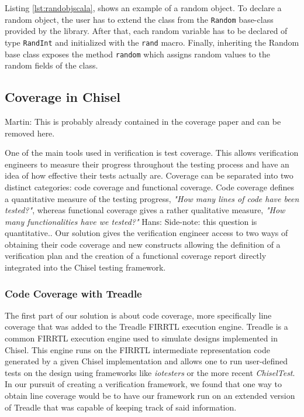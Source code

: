 \documentclass[runningheads]{llncs}
\newcommand{\code}[1]{{\small{\texttt{#1}}}}
\newcommand{\martin}[1]{{\color{blue} Martin: #1}}
\newcommand{\hjd}[1]{{\color{pink} Hans: #1}}
\begin{document}
Listing \ref{lst:randobjscala}, shows an example of a random object. To declare a random object, the user has to extend
the class from the \code{Random} base-class provided by the library. After that, each random variable has to be declared of type \code{RandInt} and initialized with the \code{rand} macro. Finally, inheriting the Random base class exposes the method \code{random} which assigns random values to the random fields of the class.

\subsection{Coverage in Chisel}

\martin{This is probably already contained in the coverage paper and can be removed here.}

One of the main tools used in verification is test coverage. This allows verification engineers to measure their progress throughout the testing process and have an idea of how effective their tests actually are. Coverage can be separated into two distinct categories: code coverage and functional coverage. Code coverage defines a quantitative measure of the testing progress, \textit{"How many lines of code have been tested?"}, whereas functional coverage gives a rather qualitative measure, \textit{"How many functionalities have we tested?"} \hjd{Side-note: this question is quantitative.}.  Our solution gives the verification engineer access to two ways of obtaining their code coverage and new constructs allowing the definition of a verification plan and the creation of a functional coverage report directly integrated into the Chisel testing framework.

\subsubsection{Code Coverage with Treadle}  
The first part of our solution is about code coverage, more specifically line coverage that was added to the Treadle FIRRTL execution engine. Treadle is a common FIRRTL execution engine used to simulate designs implemented in Chisel. This engine runs on the FIRRTL intermediate representation code generated by a given Chisel implementation and allows one to run user-defined tests on the design using frameworks like \textit{iotesters} or the more recent \textit{ChiselTest}. In our pursuit of creating a verification framework, we found that one way to obtain line coverage would be to have our framework run on an extended version of Treadle that was capable of keeping track of said information.
\end{document}
